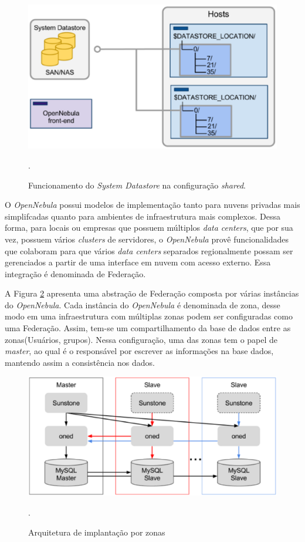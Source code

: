 \begin{figure}[!htb]
\centering
\includegraphics [keepaspectratio=true,scale=0.4]{figuras/shared_datastore.eps}
\caption{Funcionamento do \textit{System Datastore} na configuração \textit{shared}. }
\cite{opennebula}.
\label{shared_datastore}
\end{figure}

O \textit{OpenNebula} possui modelos de implementação tanto para nuvens privadas mais simplifcadas quanto para ambientes de infraestrutura mais complexos. Dessa forma, para locais ou empresas que possuem múltiplos \textit{data centers}, que por sua vez, possuem vários \textit{clusters} de servidores, o \textit{OpenNebula} provê funcionalidades que colaboram para que vários \textit{data centers} separados regionalmente possam ser gerenciados a partir de uma interface em nuvem com acesso externo. Essa integração é denominada de Federação. 

A Figura \ref{opennebulafederation} apresenta uma abstração de Federação composta por várias instâncias do \textit{OpenNebula}. Cada instância do \textit{OpenNebula} é denominada de zona, desse modo em uma infraestrutura com múltiplas zonas podem ser configuradas como uma Federação. Assim, tem-se um compartilhamento da base de dados entre as zonas(Usuários, grupos). Nessa configuração, uma das zonas tem o papel de \textit{master}, ao qual é o responsável por escrever as informações na base dados, mantendo assim a consistência nos dados\cite{opennebula}.

\begin{figure}[!htb]
\centering
\includegraphics [keepaspectratio=true,scale=0.350]{figuras/opennebula_zone.eps}
\caption{Arquitetura de implantação por zonas}
\cite{opennebula}.
\label{opennebulafederation}
\end{figure}

